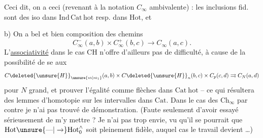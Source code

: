 Ceci dit, on a ceci (revenant à la notation $C_{\infty}$ ambivalente) :  les inclusions  fid.
sont des iso dans $\mathrm{Ind}\,\mathrm{Cat}\,\mathrm{hot}$ resp. dans $\mathrm{Hot}$, et

b) On a bel et bien  composition des chemins
\[
C_{\infty}^{-}(a,b)\times C_{\infty}^{+}(b,c)\longrightarrow C_{\infty}(a,c).
\]
L'\uline{associativité} dans le cas  $\mathrm{CH}$ n'offre d'ailleurs pas de difficulté, à cause de la possibilité de se   aux
\[
C\deleted{\unsure{H}}_{\unsure{m|m_1}}(a,b)\times C\deleted{\unsure{H}}_n(b,c)\times C_p(c,d)\rightrightarrows C_N(a,d)
\]
pour $N$ grand, et prouver l'égalité  comme flèches dans $\mathrm{Cat}\ \mathrm{hot}$ -- ce qui résultera des lemmes d'homotopie sur les intervalles dans $\mathrm{Cat}$. Dans le cas des $\mathrm{Ch}_{\infty}$ par contre je n'ai pas trouvé de démonstration. (Faute seulement d'avoir essayé sérieusement de m'y mettre ? Je n'ai pas trop envie, vu qu'il se pourrait que $\mathrm{Hot}\unsure{\text{---}|\to}\mathrm{Hot}_0^{\wedge}$ soit pleinement fidèle, auquel cas le travail devient  \ldots)

